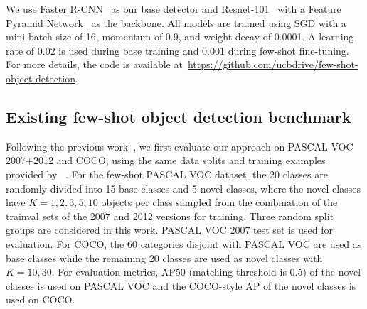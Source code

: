 We use Faster R-CNN~\cite{ren2015faster} as our base detector and Resnet-101~\cite{he2016deep} with a Feature Pyramid Network~\cite{lin2016feature} as the backbone.
All models are trained using SGD with a mini-batch size of 16, momentum of 0.9, and weight decay of 0.0001.
A learning rate of 0.02 is used during base training and 0.001 during few-shot fine-tuning.
For more details, the code is available at~\url{https://github.com/ucbdrive/few-shot-object-detection}.

\subsection{Existing few-shot object detection benchmark}
\label{sec:exist_benchmark}
Following the previous work~\cite{kang2019few,yan2019meta,wang2019meta}, we 
first evaluate our approach on PASCAL VOC 2007+2012 and COCO, using the same data splits and training examples provided by ~\citet{kang2019few}.
For the few-shot PASCAL VOC dataset,  the 20 classes are randomly divided into 15 base classes and 5 novel classes, where the novel classes have $K=1,2,3,5,10$ objects per class sampled from the combination of the trainval sets of the 2007 and 2012 versions for training. Three random split groups are considered in this work. PASCAL VOC 2007 test set is used for evaluation. For COCO, the 60 categories disjoint with PASCAL VOC are used as base classes while the remaining 20 classes are used as novel classes with $K=10, 30$.  For evaluation metrics, AP50 (matching threshold is 0.5) of the novel classes is used on PASCAL VOC and the COCO-style AP of the novel classes is used on COCO. 

